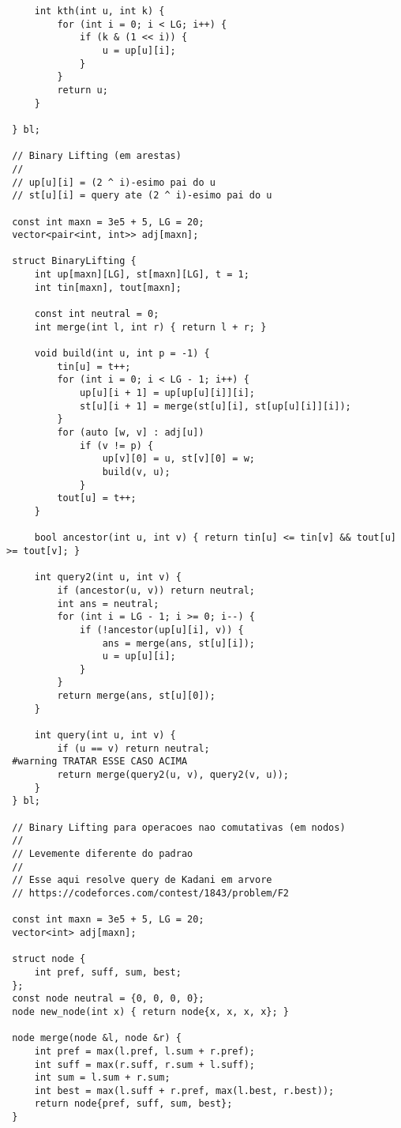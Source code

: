 \documentclass[11pt, a4paper, twoside]{article}
\begin{document}
\begin{lstlisting}
     int kth(int u, int k) {
         for (int i = 0; i < LG; i++) {
             if (k & (1 << i)) {
                 u = up[u][i];
             }
         }
         return u;
     }
 
 } bl;
 
 // Binary Lifting (em arestas)
 //
 // up[u][i] = (2 ^ i)-esimo pai do u
 // st[u][i] = query ate (2 ^ i)-esimo pai do u
 
 const int maxn = 3e5 + 5, LG = 20;
 vector<pair<int, int>> adj[maxn];
 
 struct BinaryLifting {
     int up[maxn][LG], st[maxn][LG], t = 1;
     int tin[maxn], tout[maxn];
 
     const int neutral = 0;
     int merge(int l, int r) { return l + r; }
 
     void build(int u, int p = -1) {
         tin[u] = t++;
         for (int i = 0; i < LG - 1; i++) {
             up[u][i + 1] = up[up[u][i]][i];
             st[u][i + 1] = merge(st[u][i], st[up[u][i]][i]);
         }
         for (auto [w, v] : adj[u])
             if (v != p) {
                 up[v][0] = u, st[v][0] = w;
                 build(v, u);
             }
         tout[u] = t++;
     }
 
     bool ancestor(int u, int v) { return tin[u] <= tin[v] && tout[u] >= tout[v]; }
 
     int query2(int u, int v) {
         if (ancestor(u, v)) return neutral;
         int ans = neutral;
         for (int i = LG - 1; i >= 0; i--) {
             if (!ancestor(up[u][i], v)) {
                 ans = merge(ans, st[u][i]);
                 u = up[u][i];
             }
         }
         return merge(ans, st[u][0]);
     }
 
     int query(int u, int v) {
         if (u == v) return neutral;
 #warning TRATAR ESSE CASO ACIMA
         return merge(query2(u, v), query2(v, u));
     }
 } bl;
 
 // Binary Lifting para operacoes nao comutativas (em nodos)
 //
 // Levemente diferente do padrao
 //
 // Esse aqui resolve query de Kadani em arvore
 // https://codeforces.com/contest/1843/problem/F2
 
 const int maxn = 3e5 + 5, LG = 20;
 vector<int> adj[maxn];
 
 struct node {
     int pref, suff, sum, best;
 };
 const node neutral = {0, 0, 0, 0};
 node new_node(int x) { return node{x, x, x, x}; }
 
 node merge(node &l, node &r) {
     int pref = max(l.pref, l.sum + r.pref);
     int suff = max(r.suff, r.sum + l.suff);
     int sum = l.sum + r.sum;
     int best = max(l.suff + r.pref, max(l.best, r.best));
     return node{pref, suff, sum, best};
 }
 

\end{lstlisting}
\end{document}

